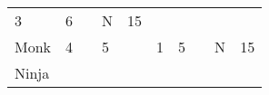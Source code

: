 \documentclass[12pt]{article}
\begin{document}
\begin{longtable}[]{@{}llllllllll@{}}
\begin{minipage}[t]{0.06\columnwidth}\raggedright\strut
3
\strut\end{minipage} &
\begin{minipage}[t]{0.06\columnwidth}\raggedright\strut
6
\strut\end{minipage} &
\begin{minipage}[t]{0.06\columnwidth}\raggedright\strut
\strut\end{minipage} &
\begin{minipage}[t]{0.07\columnwidth}\raggedright\strut
N
\strut\end{minipage} &
\begin{minipage}[t]{0.08\columnwidth}\raggedright\strut
15
\strut\end{minipage}\tabularnewline
\begin{minipage}[t]{0.13\columnwidth}\raggedright\strut
Monk
\strut\end{minipage} &
\begin{minipage}[t]{0.06\columnwidth}\raggedright\strut
4
\strut\end{minipage} &
\begin{minipage}[t]{0.06\columnwidth}\raggedright\strut
\strut\end{minipage} &
\begin{minipage}[t]{0.06\columnwidth}\raggedright\strut
5
\strut\end{minipage} &
\begin{minipage}[t]{0.06\columnwidth}\raggedright\strut
\strut\end{minipage} &
\begin{minipage}[t]{0.06\columnwidth}\raggedright\strut
1
\strut\end{minipage} &
\begin{minipage}[t]{0.06\columnwidth}\raggedright\strut
5
\strut\end{minipage} &
\begin{minipage}[t]{0.06\columnwidth}\raggedright\strut
\strut\end{minipage} &
\begin{minipage}[t]{0.07\columnwidth}\raggedright\strut
N
\strut\end{minipage} &
\begin{minipage}[t]{0.08\columnwidth}\raggedright\strut
15
\strut\end{minipage}\tabularnewline
\begin{minipage}[t]{0.13\columnwidth}\raggedright\strut
Ninja
\strut\end{minipage} &

\end{longtable}
\end{document}
